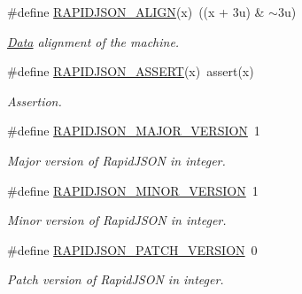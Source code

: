 \begin{DoxyCompactItemize}
\#define \hyperlink{group__RAPIDJSON__CONFIG_ga583915242504c7fdb36e826f02f76242}{R\+A\+P\+I\+D\+J\+S\+O\+N\+\_\+\+A\+L\+I\+GN}(x)~((x + 3u) \& $\sim$3u)
\begin{DoxyCompactList}\small\item\em \hyperlink{classData}{Data} alignment of the machine. \end{DoxyCompactList}\item 
\#define \hyperlink{group__RAPIDJSON__CONFIG_gabeba18d612187bad2ac62aed9276d47c}{R\+A\+P\+I\+D\+J\+S\+O\+N\+\_\+\+A\+S\+S\+E\+RT}(x)~assert(x)
\begin{DoxyCompactList}\small\item\em Assertion. \end{DoxyCompactList}\item 
\mbox{\label{group__RAPIDJSON__CONFIG_gaf1ff1685be6cbebb5d4b2ab997776f45}} 
\#define \hyperlink{group__RAPIDJSON__CONFIG_gaf1ff1685be6cbebb5d4b2ab997776f45}{R\+A\+P\+I\+D\+J\+S\+O\+N\+\_\+\+M\+A\+J\+O\+R\+\_\+\+V\+E\+R\+S\+I\+ON}~1
\begin{DoxyCompactList}\small\item\em Major version of Rapid\+J\+S\+ON in integer. \end{DoxyCompactList}\item 
\mbox{\label{group__RAPIDJSON__CONFIG_gaf9125105c593a636a79f1c2d96835376}} 
\#define \hyperlink{group__RAPIDJSON__CONFIG_gaf9125105c593a636a79f1c2d96835376}{R\+A\+P\+I\+D\+J\+S\+O\+N\+\_\+\+M\+I\+N\+O\+R\+\_\+\+V\+E\+R\+S\+I\+ON}~1
\begin{DoxyCompactList}\small\item\em Minor version of Rapid\+J\+S\+ON in integer. \end{DoxyCompactList}\item 
\mbox{\label{group__RAPIDJSON__CONFIG_gaf967d31be43666ce7f53756d73bd1cdf}} 
\#define \hyperlink{group__RAPIDJSON__CONFIG_gaf967d31be43666ce7f53756d73bd1cdf}{R\+A\+P\+I\+D\+J\+S\+O\+N\+\_\+\+P\+A\+T\+C\+H\+\_\+\+V\+E\+R\+S\+I\+ON}~0
\begin{DoxyCompactList}\small\item\em Patch version of Rapid\+J\+S\+ON in integer. \end{DoxyCompactList}\item 
\mbox{\label{group__RAPIDJSON__CONFIG_gad283cfde97d9a32b7d8e8107b11f70a6}} 

\end{DoxyCompactItemize}
